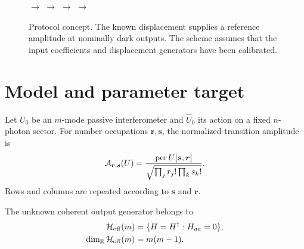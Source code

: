 \documentclass[aps,pra,reprint,amsmath,amssymb,superscriptaddress,longbibliography]{revtex4-2}
\newcommand{\per}{\operatorname{per}}
\begin{document}
\begin{figure}[t]
\centering
{}
$\longrightarrow$
$\longrightarrow$
$\longrightarrow$
$\longrightarrow$
\caption{Protocol concept.  The known displacement supplies a reference
amplitude at nominally dark outputs.  The scheme assumes that the input
coefficients and displacement generators have been calibrated.}
\label{fig:protocol}
\end{figure}

\section{Model and parameter target}
\label{sec:model}

Let $U_0$ be an $m$-mode passive interferometer and
$\widehat U_0$ its action on a fixed $n$-photon sector.  For number
occupations $\bm r,\bm s$, the normalized transition amplitude is
\begin{equation}
 {\cal A}_{\bm r,\bm s}(U)
 =\frac{\per U[\bm s,\bm r]}
 {\sqrt{\prod_jr_j!\prod_ks_k!}}.
\label{eq:fock-amplitude}
\end{equation}
Rows and columns are repeated according to $\bm s$ and $\bm r$.

The unknown coherent output generator belongs to
\begin{align}
 {\cal H}_{\rm off}(m)
 &=\{H=H^\dagger:H_{aa}=0\},\nonumber\\
 \dim_{\mathbb R}{\cal H}_{\rm off}(m)&=m(m-1).
\label{eq:hoff}
\end{align}
\end{document}
